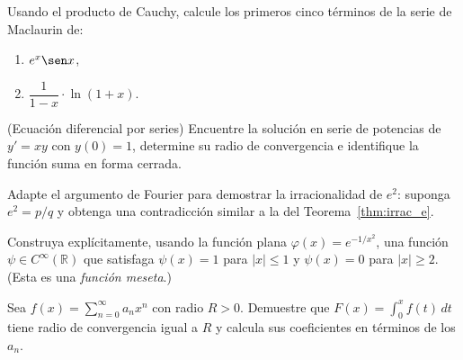 \begin{prob} Usando el producto de Cauchy, calcule los primeros cinco
          términos de la serie de Maclaurin de:
          \begin{enumerate}
              \item[(a)] $e^x \sen x$,
              \item[(b)] $\dfrac{1}{1-x}\cdot\ln(1+x)$.
          \end{enumerate}
\end{prob}

\begin{prob} (Ecuación diferencial por series) Encuentre la solución
          en serie de potencias de $y' = xy$ con $y(0)=1$, determine
          su radio de convergencia e identifique la función suma
          en forma cerrada.

\end{prob}


\begin{prob} Adapte el argumento de Fourier para demostrar la
          irracionalidad de $e^2$: suponga $e^2 = p/q$ y obtenga
          una contradicción similar a la del
          Teorema~\ref{thm:irrac_e}.
\end{prob}

\begin{prob} Construya explícitamente, usando la función plana
          $\varphi(x) = e^{-1/x^2}$, una función $\psi \in
          C^\infty(\mathbb{R})$ que satisfaga $\psi(x)=1$ para
          $|x|\leq 1$ y $\psi(x)=0$ para $|x|\geq 2$.
          (Esta es una \emph{función meseta}.)
\end{prob}

\begin{prob} Sea $f(x) = \sum_{n=0}^\infty a_n x^n$ con radio $R > 0$.
          Demuestre que $F(x) = \int_0^x f(t)\,dt$ tiene radio de
          convergencia igual a $R$ y calcula sus coeficientes en
          términos de los $a_n$.

\end{prob}